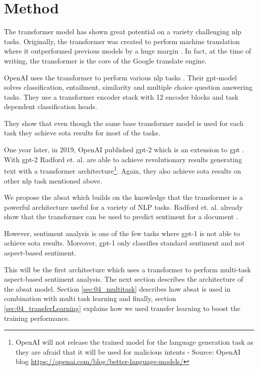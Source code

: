 \chapter{Method}
\label{ch:method}

The transformer model has shown great potential on a variety challenging \gls{nlp} tasks. Originally, the transformer was created to perform machine translation where it outperformed previous models by a huge margin \cite{Vaswani2017}. In fact, at the time of writing, the transformer is the core of the Google translate engine.
\medskip

OpenAI uses the transformer to perform various \gls{nlp} tasks \cite{Radford2018}. Their \gls{gpt}-model solves classification, entailment, similarity and multiple choice question answering tasks. They use a transformer encoder stack with 12 encoder blocks and task dependent classification heads. 

They show that even though the same base transformer model is used for each task they achieve \gls{sota} results for most of the tasks.
\medskip

One year later, in 2019, OpenAI published \gls{gpt}-2 which is an extension to \gls{gpt} \cite{Radford2019}. With \gls{gpt}-2 Radford et. al. are able to achieve revolutionary results generating text with a transformer architecture\footnote{OpenAI will not release the trained model for the language generation task as they are afraid that it will be used for malicious intents - Source: OpenAI blog \url{https://openai.com/blog/better-language-models/}}. Again, they also achieve \gls{sota} results on other \gls{nlp} task mentioned above.
\bigskip

We propose the \acrfull{absat} which builds on the knowledge that the transformer is a powerful architecture useful for a variety of NLP tasks. Radford et. al. already show that the transformer can be used to predict sentiment for a document \cite{Radford2018}. 

However, sentiment analysis is one of the few tasks where \gls{gpt}-1 is not able to achieve \gls{sota} results. Moreover, \gls{gpt}-1 only classifies standard sentiment and not aspect-based sentiment.
\medskip

This will be the first architecture which uses a transformer to perform multi-task aspect-based sentiment analysis. The next section describes the architecture of the \gls{absat} model. Section \ref{sec:04_multitask} describes how \gls{absat} is used in combination with multi task learning and finally, section \ref{sec:04_transferLearning} explains how we used transfer learning to boost the training performance.

